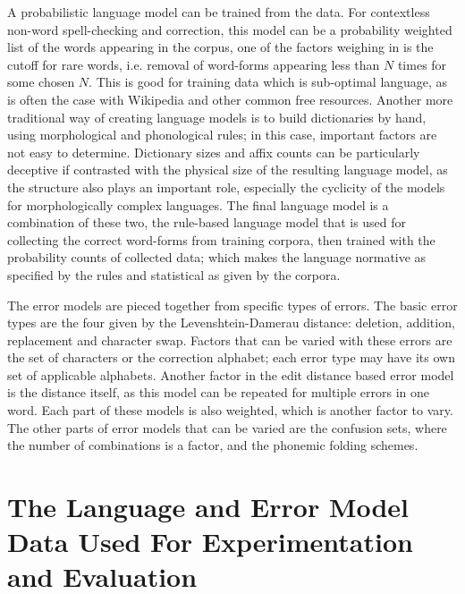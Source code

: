 \documentclass[a4paper,12pt]{article}
\begin{document}
A probabilistic language model can be trained from the data. For contextless
non-word spell-checking and correction, this model can be a probability weighted
list of the words appearing in the corpus, one of the factors weighing in is
the cutoff for rare words, i.e. removal of word-forms appearing less than $N$
times for some chosen $N$. This is good for training data which is sub-optimal
language, as is often the case with Wikipedia and other common free resources.
Another more traditional way of creating language models is to build dictionaries
by hand, using morphological and phonological rules; in this case, important
factors are not easy to determine. Dictionary sizes and affix
counts can be particularly deceptive if contrasted with the physical size of the resulting
language model, as the structure also plays an important role, especially the
cyclicity of the models for morphologically complex languages. The final
language model is a combination of these two, the rule-based language model
that is used for collecting the correct word-forms from training corpora, then
trained with the probability counts of collected data; which makes the language
normative as specified by the rules and statistical as given by the corpora.

The error models are pieced together from specific types of errors. The
basic error types are the four given by the Levenshtein-Damerau distance:
deletion, addition, replacement and character swap. Factors that can
be varied with these errors are the set of characters or the correction
alphabet; each error type may have its own set of applicable alphabets.
Another factor in the edit distance based error model is the distance itself,
as this model can be repeated for multiple errors in one word. Each part
of these models is also weighted, which is another factor to vary. The other
parts of error models that can be varied are the confusion sets, where the
number of combinations is a factor, and the phonemic folding schemes.

\section{The Language and Error Model Data Used For Experimentation and
Evaluation}
\label{sec:material}
\end{document}

